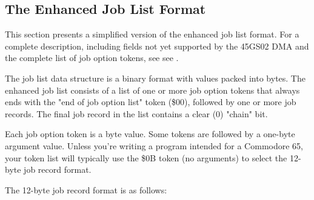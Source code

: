\subsection{The Enhanced Job List Format}

This section presents a simplified version of the enhanced job list format.
For a complete description, including fields not yet supported by the 45GS02
DMA and the complete list of job option tokens, see see .

The job list data structure is a binary format with values packed into bytes.
The enhanced job list consists of a list of one or more job
option tokens that always ends with the "end of job option list" token (\$00),
followed by one or more job records. The final job record in the list contains
a clear (0) "chain" bit.

Each job option token is a byte value. Some tokens are followed by a one-byte
argument value. Unless you're writing a program intended for
a Commodore 65, your token list will typically use the \$0B token (no
arguments) to select the 12-byte job record format.

The 12-byte job record format is as follows:

